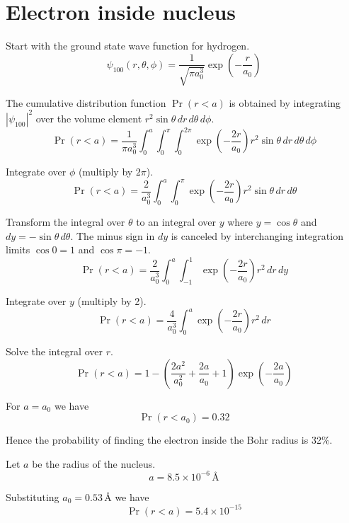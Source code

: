 

\section*{Electron inside nucleus}

Start with the ground state wave function for hydrogen.
\begin{equation*}
\psi_{100}(r,\theta,\phi)=\frac{1}{\sqrt{\pi a_0^3}}\exp\left(-\frac{r}{a_0}\right)
\end{equation*}

The cumulative distribution function $\Pr(r<a)$ is obtained by integrating
$|\psi_{100}|^2$ over the volume element $r^2\sin\theta\,dr\,d\theta\,d\phi$.
\begin{equation*}
\Pr(r<a)=\frac{1}{\pi a_0^3}
\int_0^a\int_0^\pi\int_0^{2\pi}\exp\left(-\frac{2r}{a_0}\right)
r^2\sin\theta\,dr\,d\theta\,d\phi
\end{equation*}

Integrate over $\phi$ (multiply by $2\pi$).
\begin{equation*}
\Pr(r<a)=\frac{2}{a_0^3}
\int_0^a\int_0^\pi\exp\left(-\frac{2r}{a_0}\right)r^2\sin\theta\,dr\,d\theta
\end{equation*}

Transform the integral over $\theta$ to an integral over $y$ where
$y=\cos\theta$ and $dy=-\sin\theta\,d\theta$.
The minus sign in $dy$ is canceled by interchanging integration limits
$\cos0=1$ and $\cos\pi=-1$.
\begin{equation*}
\Pr(r<a)=\frac{2}{a_0^3}
\int_0^a\int_{-1}^1\exp\left(-\frac{2r}{a_0}\right)r^2\,dr\,dy
\end{equation*}

Integrate over $y$ (multiply by 2).
\begin{equation*}
\Pr(r<a)=\frac{4}{a_0^3}
\int_0^a\exp\left(-\frac{2r}{a_0}\right)r^2\,dr
\end{equation*}

Solve the integral over $r$.
\begin{equation*}
\Pr(r<a)=1-\left(\frac{2a^2}{a_0^2}+\frac{2a}{a_0}+1\right)
\exp\left(-\frac{2a}{a_0}\right)
\tag{1}
\end{equation*}

For $a=a_0$ we have
\begin{equation*}
\Pr(r<a_0)=0.32
\end{equation*}

Hence the probability of finding the electron inside the Bohr radius is 32\%.

\bigskip
Let $a$ be the radius of the nucleus.
\begin{equation*}
a=8.5\times10^{-6}\,\text{\AA}
\end{equation*}

Substituting $a_0=0.53\,\text{\AA}$ we have
\begin{equation*}
\Pr(r<a)=5.4\times10^{-15}
\end{equation*}



